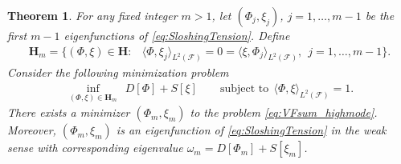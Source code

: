 \documentclass[letterpaper, 12pt]{amsart}
\newtheorem{theorem}[definition]{Theorem}
\renewcommand{\H}{\mathbf{H}}
\newcommand{\F}{\mathcal{F}}
\begin{document}
\begin{theorem}\label{thm:VFsum_highmode}
For any fixed integer $m>1$, let $(\Phi_j,\xi_j)$, $j=1,\ldots,m-1$ be the first $m-1$ eigenfunctions of \eqref{eq:SloshingTension}. Define 
\begin{align*}
\H_m = \Big\{(\Phi,\xi)\in\H\colon & \langle\Phi,\xi_j\rangle_{L^2(\F)}= 0 =  \langle\xi,\Phi_j\rangle_{L^2(\F)}, \ \  j=1,\ldots,m-1 \Big\}.
\end{align*}
Consider the following minimization problem
\begin{align}\label{eq:VFsum_highmode}
\inf_{(\Phi,\xi)\in \H_m } \ \  D[\Phi] + S[\xi]
\qquad  
\textrm{subject to} \ \  \langle\Phi,\xi\rangle_{L^2(\F)} = 1. 
\end{align}
There exists a minimizer $(\Phi_m,\xi_m)$ to the problem \eqref{eq:VFsum_highmode}. Moreover, $(\Phi_m,\xi_m)$  is an eigenfunction of \eqref{eq:SloshingTension} in the weak sense with corresponding eigenvalue $\omega_m=D[\Phi_m]+S[\xi_m]$.
\end{theorem}
\end{document}
